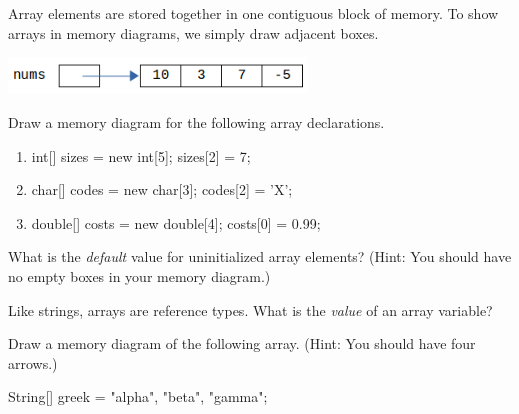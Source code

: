 
Array elements are stored together in one contiguous block of memory. To show arrays in memory diagrams, we simply draw adjacent boxes.

\begin{center}

\vspace{1ex}
\includegraphics[width=225pt]{CS1/array-diagram1.png}
\end{center}




\Q Draw a memory diagram for the following array declarations.

\begin{enumerate}

\item
\begin{javalst}
int[] sizes = new int[5];
sizes[2] = 7;
\end{javalst}

\item
\begin{javalst}
char[] codes = new char[3];
codes[2] = 'X';
\end{javalst}

\item
\begin{javalst}
double[] costs = new double[4];
costs[0] = 0.99;
\end{javalst}

\end{enumerate}


\Q What is the \emph{default} value for uninitialized array elements? (Hint: You should have no empty boxes in your memory diagram.)

\begin{answer}
\end{answer}


\Q Like strings, arrays are reference types. What is the \emph{value} of an array variable?

\begin{answer}
\end{answer}


\Q Draw a memory diagram of the following array.
(Hint: You should have four arrows.)

\begin{javalst}
String[] greek = {"alpha", "beta", "gamma"};
\end{javalst}

\begin{answer}
\end{answer}
